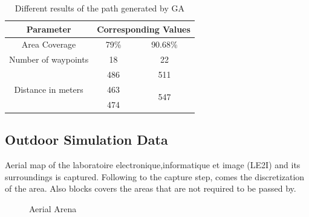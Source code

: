 \begin{table}[H]
\centering
\caption{Different results of the path generated by GA}
\label{my-label}
\begin{tabular}{|c|c|c|}
\hline
    Parameter   &  \multicolumn{2}{c|}{Corresponding Values}                 \\ \hline
    Area Coverage    & 79\% & 90.68\%                   \\ \hline
             
           Number of waypoints     & 18 & 22                  \\ \hline
\multirow{4}{*}{Distance in meters} & 486 &  511                 \\ \cline{2-3} 
                 & \multirow{2}{*}{463} & \multirow{3}{*}{547} \\ \cline{2-2} 
                    &  \\ \cline{2-2}
                  & 474 &                   \\ \hline
\end{tabular}
\end{table}

\subsection{Outdoor Simulation Data}

Aerial map of the laboratoire electronique,informatique et image (LE2I) and its surroundings is captured.  Following to the capture step, comes the discretization of the area. Also blocks covers the areas that are not required to be passed by.

\begin{figure}[H]
\label{pot_field}
  \caption{Aerial Arena }
\end{figure}

